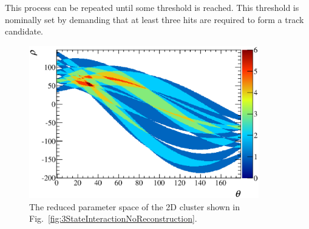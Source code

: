 \newline
This process can be repeated until some threshold is reached.  This threshold is nominally set by demanding that at least three hits are required to form a track candidate.
\begin{figure}
  \centering
  \includegraphics[width=10cm]{images/ecal_hough_transform/ReducedParameterSpace_3StateInteraction.eps}
  \caption{The reduced parameter space of the 2D cluster shown in Fig.~\ref{fig:3StateInteractionNoReconstruction}.}
  \label{fig:ReducedParameterSpace3StateInteraction}
\end{figure}


